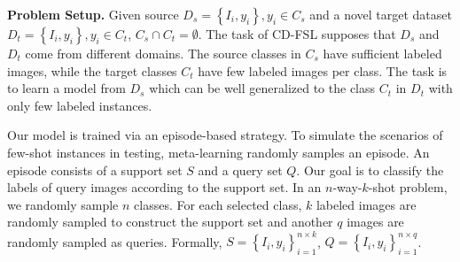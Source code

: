 \documentclass{article}
\begin{document}
\noindent\textbf{Problem Setup.} 
Given  source  $D_{s} = \left\{I_{i}, y_{i}\right\}, y_{i} \in C_{s}$ and a novel target dataset $D_{t} = \left\{I_{i}, y_{i}\right\}, y_{i} \in C_{t}$, $C_{s} \cap C_{t} = \emptyset$. The task of CD-FSL supposes that $D_s$ and  $D_t$ come from different domains. The source classes in $C_{s}$ have sufficient labeled images, while  the target classes $C_{t}$ have few labeled images per class. The task is to learn a model from $D_{s}$ which can be well generalized to the class $C_{t}$ in $D_{t}$ with only few labeled instances.

Our model is trained via an episode-based strategy. To simulate the scenarios of few-shot instances in testing, meta-learning randomly samples an episode. An episode consists of a support set $S$ and a query set $Q$. Our goal is to classify the labels of query images according to the support set. In an $n$-way-$k$-shot problem, we randomly sample $n$ classes. For each selected class, $k$ labeled images are randomly sampled to construct the support set and another $q$ images are randomly sampled as queries. Formally, $S=\left\{I_i, y_i\right\}_{i=1}^{n\times k}$, $Q=\left\{I_i, y_i\right\}_{i=1}^{n\times q }$.
\end{document}
